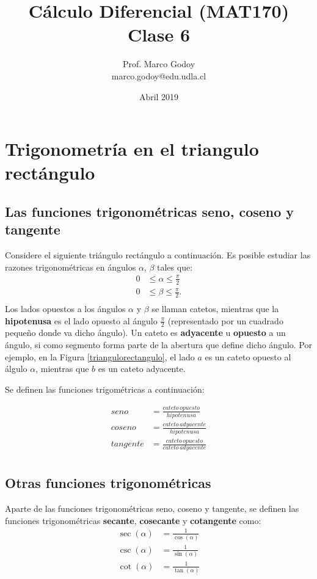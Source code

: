 \documentclass[10pt]{article}
\title{C\'alculo Diferencial (MAT170)\\ Clase 6 }
\author{Prof. Marco Godoy\\
marco.godoy@edu.udla.cl}
\date{Abril 2019}
\newcommand{\2}[1]{\hspace{-0.93cm}\colorbox{color1}{\hspace{0.07cm} \parbox{17cm}{\vspace{0.2cm} #1}\hspace*{0.07cm} }}
\newcommand{\3}[1]{\hspace{-0.93cm}\colorbox{color7}{\hspace{0.07cm} \parbox{17cm}{\vspace{0.2cm} #1}\hspace*{0.07cm} }}
\theoremstyle{theorem}
\numberwithin{equation}{section}
\newcommand{\dis}{\displaystyle}
\begin{document}
\maketitle

\section{Trigonometr\'ia en el triangulo rect\'angulo}

\subsection{Las funciones trigonom\'etricas seno, coseno y tangente}
Considere el siguiente tri\'angulo rect\'angulo a continuaci\'on. Es posible estudiar las razones trigonom\'etricas en \'angulos $\alpha,\, \beta$ tales que: 
\begin{align*}
0&\leq\alpha\leq \frac{\pi}{2}\\
0&\leq\beta\leq \frac{\pi}{2}.\\ 
\end{align*}
Los lados opuestos a los \'angulos $\alpha$ y $\beta$ se llaman catetos, mientras que la \textbf{hipotenusa} es el lado opuesto al \'angulo $\dis \frac{\pi}{2}$ (representado por un cuadrado peque\~no donde va dicho \'angulo). Un cateto es \textbf{adyacente} u \textbf{opuesto} a un \'angulo, si como segmento forma parte de la abertura que define dicho \'angulo. Por ejemplo, en la Figura \ref{triangulorectangulo}, el lado $a$ es un cateto opuesto al \'algulo $\alpha$, mientras que $b$ es un cateto adyacente.

Se definen las funciones trigom\'etricas a continuaci\'on:

\begin{align*}
seno &= \frac{cateto\, opuesto}{hipotenusa}\\
coseno &= \frac{cateto\, adyacente}{hipotenusa}\\
tangente &=\frac{cateto\, opuesto}{cateto\, adyacente}\\
\end{align*} 

\subsection{Otras funciones trigonom\'etricas}\label{otras_trigo}

Aparte de las funciones trigonom\'etricas seno, coseno y tangente, se definen las funciones trigonom\'etricas \textbf{secante}, \textbf{cosecante} y \textbf{cotangente} como: 
\begin{align*}
\sec(\alpha)&=\frac{1}{\cos(\alpha)}\\
\csc(\alpha)&=\frac{1}{\sin(\alpha)}\\
\cot(\alpha)&=\frac{1}{\tan(\alpha)}
\end{align*}
\end{document}
